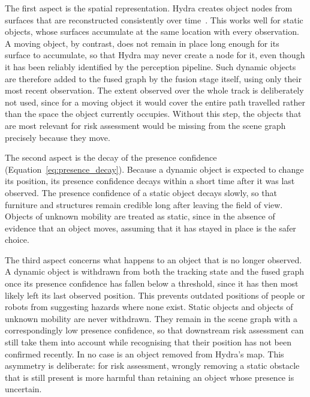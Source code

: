 {The first aspect is the spatial representation. Hydra creates object nodes from surfaces that are reconstructed consistently over time~\cite{hughes2022hydra}. This works well for static objects, whose surfaces accumulate at the same location with every observation. A moving object, by contrast, does not remain in place long enough for its surface to accumulate, so that Hydra may never create a node for it, even though it has been reliably identified by the perception pipeline. Such dynamic objects are therefore added to the fused graph by the fusion stage itself, using only their most recent observation. The extent observed over the whole track is deliberately not used, since for a moving object it would cover the entire path travelled rather than the space the object currently occupies. Without this step, the objects that are most relevant for risk assessment would be missing from the scene graph precisely because they move.

The second aspect is the decay of the presence confidence (Equation~\ref{eq:presence_decay}). Because a dynamic object is expected to change its position, its presence confidence decays within a short time after it was last observed. The presence confidence of a static object decays slowly, so that furniture and structures remain credible long after leaving the field of view. Objects of unknown mobility are treated as static, since in the absence of evidence that an object moves, assuming that it has stayed in place is the safer choice.

The third aspect concerns what happens to an object that is no longer observed. A dynamic object is withdrawn from both the tracking state and the fused graph once its presence confidence has fallen below a threshold, since it has then most likely left its last observed position. This prevents outdated positions of people or robots from suggesting hazards where none exist. Static objects and objects of unknown mobility are never withdrawn. They remain in the scene graph with a correspondingly low presence confidence, so that downstream risk assessment can still take them into account while recognising that their position has not been confirmed recently. In no case is an object removed from Hydra's map. This asymmetry is deliberate: for risk assessment, wrongly removing a static obstacle that is still present is more harmful than retaining an object whose presence is uncertain.

}








































